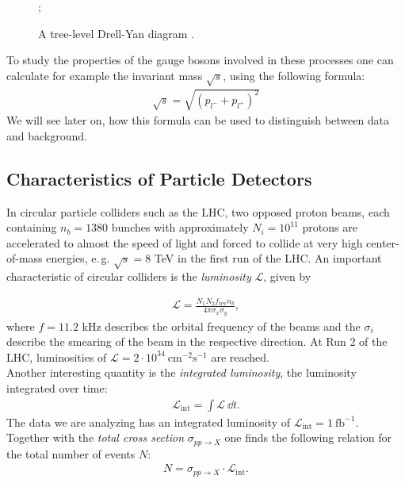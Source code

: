 \documentclass[twocolumn,
			   showpacs,%
               nofootinbib,
               aps,%
               prd,
               notitlepage,
               showkeys,
               10pt]{revtex4-1}
\begin{document}
\begin{figure}[H]
\centering
{};
\caption{A tree-level Drell-Yan diagram \cite{F91manual}.}
\label{fig:Drell-Yan}
\end{figure}
	
To study the properties of the gauge bosons involved in these processes one can calculate for example the invariant mass $\sqrt{s}$, using the following formula:
\begin{align}
	\sqrt{s} = \sqrt{\left(p_{l^{-}} + p_{l^{+}}\right)^2}
\end{align}
We will see later on, how this formula can be used to distinguish between data and background.
\subsection{Characteristics of Particle Detectors}
In circular particle colliders such as the LHC, two opposed proton beams, each containing $n_b = 1380$ bunches with approximately $N_i = 10^{11}$ protons are accelerated to almost the speed of light and forced to collide at very high center-of-mass energies, e.\,g. $\sqrt{s} = 8$ TeV in the first run of the LHC. An important characteristic of circular colliders is the \textit{luminosity} $\mathcal{L}$, given by

\begin{align}
\mathcal{L} = \frac{N_1N_2f_{\text{rev}}n_b}{4\pi\sigma_x\sigma_y},
\end{align}
where $f = 11.2$ kHz describes the orbital frequency of the beams and the $\sigma_i$ describe the smearing of the beam in the respective direction. At Run 2 of the LHC, luminosities of $\mathcal{L}=2\cdot10^{34} \ \mathrm{cm}^{-2} \mathrm{s}^{-1}$ are reached.\\
Another interesting quantity is the \textit{integrated luminosity}, the luminosity integrated over time:
\begin{align}
\mathcal{L}_{\text{int}} = \int \mathcal{L} \ \dd t.
\end{align}
The data we are analyzing has an integrated luminosity of $\mathcal{L}_{\mathrm{int}}=1 \ \mathrm{fb}^{-1}$.\\
Together with the \textit{total cross section} $\sigma_{pp\rightarrow X}$ one finds the following relation for the total number of events $N$: 
\begin{align}
N = \sigma_{pp\rightarrow X} \cdot \mathcal{L}_{\text{int}}.
\end{align}
\end{document}
